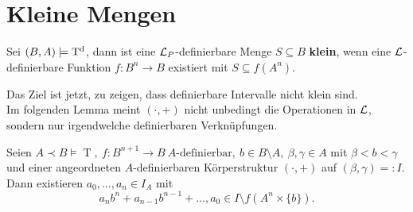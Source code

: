 \section{Kleine Mengen}
\begin{definition}
	Sei $(B,A)\models\operatorname{T^d}$, dann ist eine $\mathcal{L}_P$-definierbare Menge $S\subseteq B$ \textbf{klein}, wenn eine $\mathcal{L}$-definierbare Funktion $f:B^n\rightarrow B$ existiert mit $S\subseteq f(A^n)$.
\end{definition}

Das Ziel ist jetzt, zu zeigen, dass definierbare Intervalle nicht klein sind.\\
Im folgenden Lemma meint $(\cdot,+)$ nicht unbedingt die Operationen in $\mathcal{L}$, sondern nur irgendwelche definierbaren Verknüpfungen.

\begin{lemma}\label{Hilfsaussage Kleinheit}
	Seien $A\prec B\models\operatorname{T},\ f:B^{n+1}\rightarrow B\ A\text{-definierbar},\ b\in B\setminus A,\ {\beta,\gamma\in A}$ mit $\beta<b<\gamma$ und einer angeordneten $A$-definierbaren Körperstruktur $(\cdot,+)$ auf $(\beta,\gamma)=:I$. Dann existieren $a_0,\dots,a_n\in I_A$ mit $$a_nb^n+a_{n-1}b^{n-1}+\dots,a_0\in I\setminus f(A^n\times\{b\}).$$
\end{lemma}
